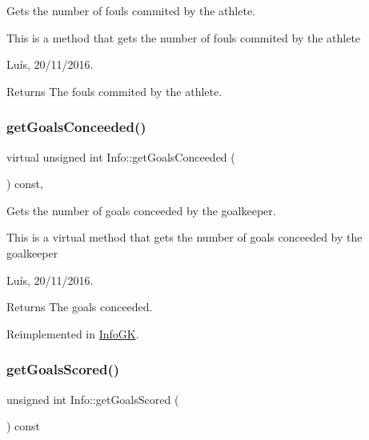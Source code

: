 Gets the number of fouls commited by the athlete. 

This is a method that gets the number of fouls commited by the athlete

Luís, 20/11/2016. 

\begin{DoxyReturn}{Returns}
The fouls commited by the athlete. 
\end{DoxyReturn}
\hypertarget{class_info_a41d954fad291a5ffdfe29cb1cf3f75ce}{}\label{class_info_a41d954fad291a5ffdfe29cb1cf3f75ce} 
\subsubsection{\texorpdfstring{get\+Goals\+Conceeded()}{getGoalsConceeded()}}
{\footnotesize\ttfamily virtual unsigned int Info\+::get\+Goals\+Conceeded (\begin{DoxyParamCaption}{ }\end{DoxyParamCaption}) const\hspace{0.3cm}{\ttfamily [inline]}, {\ttfamily [virtual]}}



Gets the number of goals conceeded by the goalkeeper. 

This is a virtual method that gets the number of goals conceeded by the goalkeeper

Luís, 20/11/2016. 

\begin{DoxyReturn}{Returns}
The goals conceeded. 
\end{DoxyReturn}


Reimplemented in \hyperlink{class_info_g_k_a069874de6c798b3237388f3dbdb14de1}{Info\+GK}.

\hypertarget{class_info_a2f29d691be81af12140d1bb88c9b7bad}{}\label{class_info_a2f29d691be81af12140d1bb88c9b7bad} 
\subsubsection{\texorpdfstring{get\+Goals\+Scored()}{getGoalsScored()}}
{\footnotesize\ttfamily unsigned int Info\+::get\+Goals\+Scored (\begin{DoxyParamCaption}{ }\end{DoxyParamCaption}) const}




